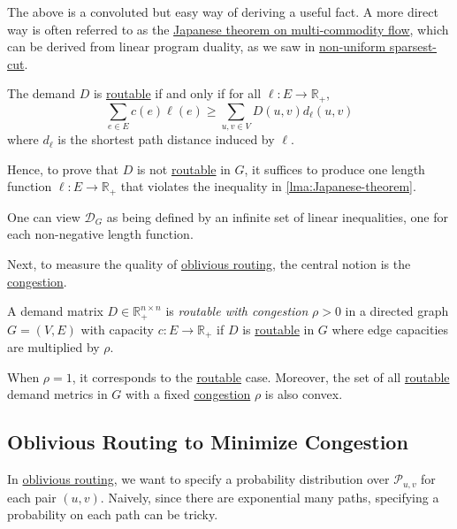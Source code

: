 The above is a convoluted but easy way of deriving a useful fact. A more direct way is often referred to as the \hyperref[lma:Japanese-theorem]{Japanese theorem on multi-commodity flow}, which can be derived from linear program duality, as we saw in \hyperref[prb:non-uniform-sparsest-cut]{non-uniform sparsest-cut}.

\begin{lemma}\label{lma:Japanese-theorem}
	The demand \(D\) is \hyperref[def:routable]{routable} if and only if for all \(\ell \colon E \to \mathbb{R} _+\),
	\[
		\sum_{e \in E} c(e) \ell (e) \geq \sum_{u, v \in V} D(u, v) d_{\ell } (u, v)
	\]
	where \(d_{\ell } \) is the shortest path distance induced by \(\ell \).
\end{lemma}

Hence, to prove that \(D\) is not \hyperref[def:routable]{routable} in \(G\), it suffices to produce one length function \(\ell \colon E \to \mathbb{R} _+\) that violates the inequality in \autoref{lma:Japanese-theorem}.

\begin{intuition}
	One can view \(\mathcal{D} _G\) as being defined by an infinite set of linear inequalities, one for each non-negative length function.
\end{intuition}

Next, to measure the quality of \hyperref[prb:oblivious-routing]{oblivious routing}, the central notion is the \hyperref[def:congestion]{congestion}.

\begin{definition}[Congestion]\label{def:congestion}
	A demand matrix \(D \in \mathbb{R} _+^{n \times n}\) is \emph{routable with congestion} \(\rho > 0\) in a directed graph \(G = (V, E)\) with capacity \(c \colon E \to \mathbb{R} _+\) if \(D\) is \hyperref[def:routable]{routable} in \(G\) where edge capacities are multiplied by \(\rho \).
\end{definition}

When \(\rho = 1\), it corresponds to the \hyperref[def:routable]{routable} case. Moreover, the set of all \hyperref[def:routable]{routable} demand metrics in \(G\) with a fixed \hyperref[def:congestion]{congestion} \(\rho \) is also convex.

\subsection{Oblivious Routing to Minimize Congestion}
In \hyperref[prb:oblivious-routing]{oblivious routing}, we want to specify a probability distribution over \(\mathcal{P} _{u, v}\) for each pair \((u, v)\). Naively, since there are exponential many paths, specifying a probability on each path can be tricky.

